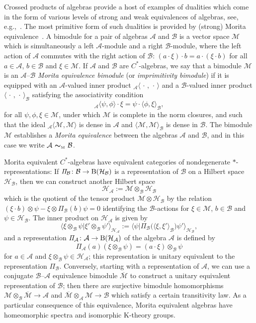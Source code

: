 \documentclass[10pt,a4paper]{amsart}
\numberwithin{equation}{section}
\newcommand{\mbf}[1]{{\boldsymbol {#1} }}
\newcommand{\Pim}{{\mathit\Pi}}
\newcommand{\rmB}{{\rm B}}
\def\alg{{\mathcal A}}
\def\balg{{\mathcal B}}
\def\hil{{\mathcal H}}
\def\Mcal{{\mathcal M}}
\begin{document}
Crossed products of algebras provide a host of examples of dualities
which come in the form of various levels of strong and weak
equivalences of algebras, see, e.g.,~\cite{Brodzki2006}. The most
primitive form of such dualities is provided by (strong) Morita
equivalence~\cite{Rieffel1974}. A bimodule for a pair of algebras $\alg$ and $\balg$ is a
vector space $\Mcal$ which is simultaneously
 a left $\alg$-module and a right $\balg$-module, where the left action
 of $\alg$ commutes with the right action of $\balg$: $(a\cdot\xi)\cdot
 b=a\cdot (\xi\cdot b)$ for all $a\in \alg$, $b\in
 \balg$ and $\xi\in \Mcal$. If $\alg$ and $\balg$ are $C^*$-algebras,
 we say that a bimodule $\Mcal$ is an $\alg$--$\balg$ \emph{Morita
 equivalence bimodule} (or \emph{imprimitivity bimodule}) if it
is equipped with an $\alg$-valued inner product
${}_\alg\langle\,\cdot\,,\,\cdot\,\rangle$ and a $\balg$-valued inner
product $\langle\,\cdot\,,\,\cdot\,\rangle_\balg$ satisfying the
associativity condition
\[
{}_\alg\langle \psi,\phi\rangle \cdot \xi =
\psi\cdot\langle\phi,\xi\rangle_\balg ,
\]
for all $\psi,\phi,\xi\in\Mcal$, under which $\Mcal$ is complete in
the norm closures, and such that the ideal ${}_\alg\langle
\Mcal,\Mcal\rangle$ is dense in $\alg$ and $\langle
\Mcal,\Mcal\rangle_\balg$ is dense in $\balg$. The bimodule $\Mcal$ establishes a
\emph{Morita equivalence} between the algebras $\alg$ and $\balg$, and
in this case we write $\alg\ \mbf\sim_{\text{\tiny M}}\ \balg$.

Morita equivalent $C^*$-algebras have equivalent categories of
nondegenerate $*$-representations: If $\Pim_\balg\colon \balg\to{\rm B}(\hil_\balg)$ is a
representation of $\balg$ on a Hilbert space $\hil_\balg$, then we can
construct another Hilbert space
\[
\hil_\alg:=\Mcal\otimes_\balg\hil_\balg
\]
which is the quotient of the tensor product $\Mcal\otimes\hil_\balg$ by the relation $(\xi\cdot
b)\otimes\psi-\xi\otimes\Pim_\balg(b)\psi=0$ identifying the
$\balg$-actions for
$\xi\in\Mcal$, $b\in\balg$ and $\psi\in\hil_\balg$. The inner product
on $\hil_\alg$ is given by
\[
\big\langle\xi\otimes_\balg\psi\big|
\xi'\otimes_\balg\psi'\big\rangle_{\hil_\alg} :=
\big\langle\psi\big|\Pim_\balg\big(\langle\xi,\xi'\rangle_\balg
\big)\psi'\big\rangle_{\hil_\balg} ,
\]
and a representation $\Pim_\alg\colon \alg\to\rmB(\hil_\alg)$ of the algebra
$\alg$ is defined by
\[
\Pim_\alg(a)(\xi\otimes_\balg\psi) = (a\cdot\xi) \otimes_\balg\psi
\]
for $a\in\alg$ and $\xi\otimes_\balg\psi\in\hil_\alg$; this
representation is unitary equivalent to the representation
$\Pim_\balg$. Conversely, starting with a representation of $\alg$, we
can use a conjugate $\balg$--$\alg$ equivalence bimodule
$\overline{\Mcal}$ to construct a unitary equivalent representation of
$\balg$; then there are surjective bimodule homomorphisms
$\Mcal\otimes_\balg\overline{\Mcal}\to\alg$ and
$\overline{\Mcal}\otimes_\alg\Mcal\to\balg$ which satisfy a certain
transitivity law. As a particular consequence of this equivalence, Morita
equivalent algebras have homeomorphic spectra and isomorphic K-theory groups.
\end{document}
